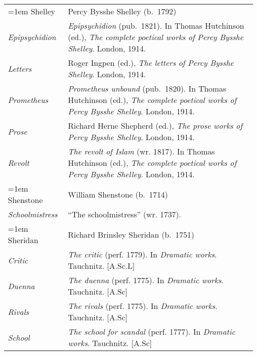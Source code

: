 \begin{xltabular}{\textwidth}{ lQ }
\pagebreak
\hangindent=1em  Shelley & Percy Bysshe Shelley (b.~1792) \\
\hspace{1em}\textit{Epi\-psychidion} & \textit{Epipsychidion} (pub.~1821). In Thomas Hutchinson (ed.), \textit{The complete poetical works of Percy Bysshe Shelley}. London, 1914. \\
\hspace{1em}\textit{Letters} & Roger Ingpen (ed.), \textit{The letters of Percy Bysshe Shelley}. London, 1914. \\
\hspace{1em}\textit{Prometheus} & \textit{Prometheus unbound} (pub.~1820). In Thomas Hutchinson (ed.), \textit{The complete poetical works of Percy Bysshe Shelley}. London, 1914.  \\
\hspace{1em}\textit{Prose} & Richard Herne Shepherd (ed.), \textit{The prose works of Percy Bysshe Shelley}. London, 1914. \\ %
\hspace{1em}\textit{Revolt} & \textit{The revolt of Islam} (wr. 1817). In Thomas Hutchinson (ed.), \textit{The complete poetical works of Percy Bysshe Shelley}. London, 1914. \\

\hangindent=1em  Shenstone & William Shenstone (b.~1714)\\
\hspace{1em}\textit{Schoolmistress} & ``The schoolmistress'' (wr. 1737).\\

\hangindent=1em  Sheridan & Richard Brinsley Sheridan (b.~1751) \\
\hspace{1em}\textit{Critic} & \textit{The critic} (perf. 1779). In \textit{Dramatic works}. Tauchnitz. [A.Sc.L] \\ 
\hspace{1em}\textit{Duenna} & \textit{The duenna} (perf. 1775). In \textit{Dramatic works}. Tauchnitz. [A.Sc] \\ %
\hspace{1em}\textit{Rivals} & \textit{The rivals} (perf. 1775). In \textit{Dramatic works}. Tauchnitz. [A.Sc] \\
\hspace{1em}\textit{School} & \textit{The school for scandal} (perf. 1777). In \textit{Dramatic works}. Tauchnitz. [A.Sc] \\


\end{xltabular}
